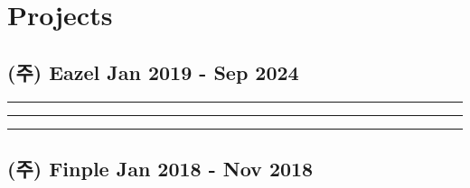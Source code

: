 \section{Projects}
\subsection*{(주) Eazel \hfill Jan 2019 - Sep 2024}

\noindent\rule{8cm}{0.4pt}

\noindent\rule{8cm}{0.4pt}

\noindent\rule{16cm}{0.4pt}
\subsection*{(주) Finple \hfill Jan 2018 - Nov 2018}

    